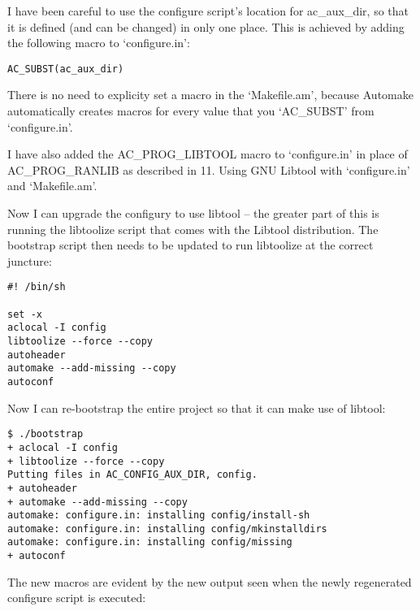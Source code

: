 I have been careful to use the configure script's location for ac\_{}aux\_{}dir, so that it is defined (and can be changed) in only one place. This is achieved by adding the following macro to `configure.in': 


\begin{Verbatim}[frame=single]
AC_SUBST(ac_aux_dir)
\end{Verbatim}

There is no need to explicity set a macro in the `Makefile.am', because Automake automatically creates macros for every value that you `AC\_{}SUBST' from `configure.in'. 


I have also added the AC\_{}PROG\_{}LIBTOOL macro to `configure.in' in place of AC\_{}PROG\_{}RANLIB as described in 11. Using GNU Libtool with `configure.in' and `Makefile.am'. 


Now I can upgrade the configury to use libtool -- the greater part of this is running the libtoolize script that comes with the Libtool distribution. The bootstrap script then needs to be updated to run libtoolize at the correct juncture: 

\begin{Verbatim}[frame=single]
#! /bin/sh

set -x
aclocal -I config
libtoolize --force --copy
autoheader
automake --add-missing --copy
autoconf
\end{Verbatim}

Now I can re-bootstrap the entire project so that it can make use of libtool: 

\begin{Verbatim}[frame=single]
$ ./bootstrap
+ aclocal -I config
+ libtoolize --force --copy
Putting files in AC_CONFIG_AUX_DIR, config.
+ autoheader
+ automake --add-missing --copy
automake: configure.in: installing config/install-sh
automake: configure.in: installing config/mkinstalldirs
automake: configure.in: installing config/missing
+ autoconf
\end{Verbatim}

The new macros are evident by the new output seen when the newly regenerated configure script is executed:

